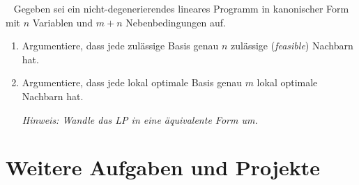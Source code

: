 \documentclass{uebung_cs}
\begin{document}
\begin{exercise}\
%
%
	Gegeben sei ein nicht-degenerierendes lineares Programm in kanonischer Form mit $n$ Variablen und $m + n$ Nebenbedingungen auf.
	\begin{enumerate}
		\item\hard Argumentiere, dass jede zulässige Basis genau $n$ zulässige (\textit{feasible}) Nachbarn hat.
		\item\hard Argumentiere, dass jede lokal optimale Basis genau $m$ lokal optimale Nachbarn hat.
		
		\emph{Hinweis: Wandle das LP in eine äquivalente Form um.}
	\end{enumerate}
\end{exercise}


\section*{Weitere Aufgaben und Projekte}
\end{document}
